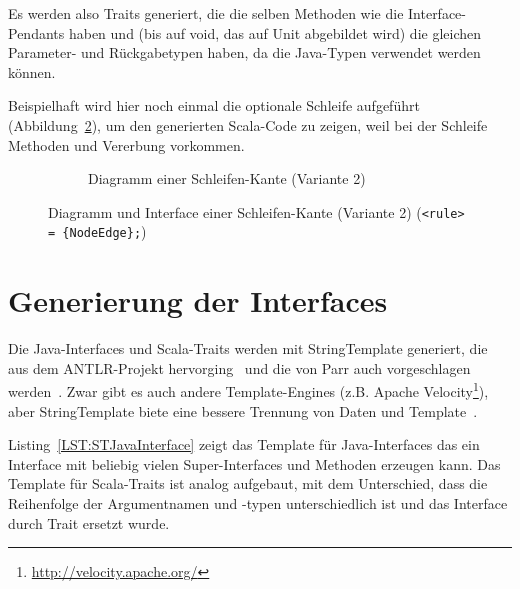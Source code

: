 \documentclass[../InterneDSLs.tex]{subfiles}
\begin{document}
Es werden also Traits generiert, die die selben Methoden wie die Interface-Pendants haben und (bis auf void, das auf Unit abgebildet wird) die gleichen Parameter- und Rückgabetypen haben, da die Java-Typen verwendet werden können.

Beispielhaft wird hier noch einmal die optionale Schleife aufgeführt (Abbildung~\ref{FIG:ScalaLoopNodeAlt}), um den generierten Scala-Code zu zeigen, weil bei der Schleife Methoden und Vererbung vorkommen.
\begin{figure}[ht]
\centering
  \begin{subfigure}[c]{0.49\textwidth}
    \caption{Diagramm einer Schleifen-Kante (Variante 2)}
    \label{FIG:ScalaDiagramLoopNodeAlt}
  \end{subfigure}
  \begin{subfigure}[c]{0.49\textwidth}
    
  \end{subfigure}
  \caption[Abbildung einer Sequenz auf einen Sala-Trait]{Diagramm und Interface einer Schleifen-Kante (Variante 2) (\texttt{<rule> = \{NodeEdge\};})}
  \label{FIG:ScalaLoopNodeAlt}
\end{figure}


\section{Generierung der Interfaces}
Die Java-Interfaces und Scala-Traits werden mit StringTemplate generiert, die aus dem ANTLR-Projekt hervorging~\cite{stringtemplate.github} und die von Parr auch vorgeschlagen werden~\cite[S. 313 ff]{Parr.2010}. Zwar gibt es auch andere Template-Engines (z.B. Apache Velocity\footnote{\url{http://velocity.apache.org/}}), aber StringTemplate biete eine bessere Trennung von Daten und Template~\cite{parr2004enforcing}.

Listing~\ref{LST:STJavaInterface} zeigt das Template für Java-Interfaces das ein Interface mit beliebig vielen Super-Interfaces und Methoden erzeugen kann. Das Template für Scala-Traits ist analog aufgebaut, mit dem Unterschied, dass die Reihenfolge der Argumentnamen und -typen unterschiedlich ist und das Interface durch Trait ersetzt wurde.
\end{document}
